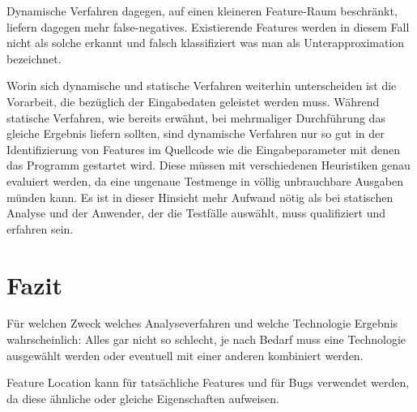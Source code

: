 \documentclass[runningheads,a4paper]{llncs}
\begin{document}
Dynamische Verfahren dagegen, auf einen kleineren Feature-Raum beschränkt, liefern dagegen mehr false-negatives. Existierende Features
werden in diesem Fall nicht als solche erkannt und falsch klassifiziert was man als Unterapproximation bezeichnet.

Worin sich dynamische und statische Verfahren weiterhin unterscheiden ist die Vorarbeit, die bezüglich der Eingabedaten geleistet werden muss. Während statische Verfahren, wie bereits erwähnt, bei mehrmaliger Durchführung das gleiche Ergebnis liefern sollten, sind dynamische Verfahren nur so gut in der Identifizierung von Features im Quellcode wie die Eingabeparameter mit denen das Programm gestartet wird. Diese müssen mit verschiedenen Heuristiken genau evaluiert werden, da eine ungenaue Testmenge in völlig unbrauchbare Ausgaben münden kann. Es ist in dieser Hinsicht mehr Aufwand nötig als bei statischen Analyse und der Anwender, der die Testfälle auswählt, muss qualifiziert und erfahren sein.

\section{Fazit}
Für welchen Zweck welches Analyseverfahren und welche Technologie
Ergebnis wahrscheinlich: Alles gar nicht so schlecht, je nach Bedarf muss eine Technologie ausgewählt werden oder eventuell mit einer anderen kombiniert werden.

Feature Location kann für tatsächliche Features und für Bugs verwendet werden, da diese ähnliche oder gleiche Eigenschaften aufweisen.




\clearpage

\end{document}
